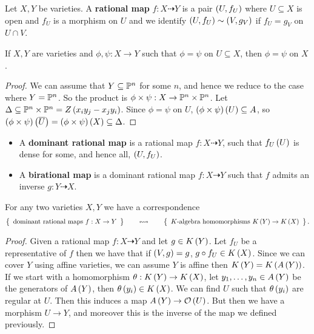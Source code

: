 
\begin{definition}
Let $ X, Y $ be varieties. A \textbf{rational map} $ f : X \dashrightarrow Y $ is a pair $ \rb{U, f_U} $ where $ U \subseteq X $ is open and $ f_U $ is a morphism on $ U $ and we identify $ \rb{U, f_U} \sim \rb{V, g_V} $ if $ f_U = g_V $ on $ U \cap V $.
\end{definition}

\begin{lemma}
If $ X, Y $ are varieties and $ \phi, \psi : X \to Y $ such that $ \phi = \psi $ on $ U \subseteq X $, then $ \phi = \psi $ on $ X $.
\end{lemma}

\begin{proof}
We can assume that $ Y \subseteq \P^n $ for some $ n $, and hence we reduce to the case where $ Y = \P^n $. So the product is $ \phi \times \psi : X \to \P^n \times \P^n $. Let $ \Delta \subseteq \P^n \times \P^n = Z\rb{x_iy_j - x_jy_i} $. Since $ \phi = \psi $ on $ U $, $ \rb{\phi \times \psi}\rb{U} \subseteq A $, so $ \rb{\phi \times \psi}\rb{\overline{U}} = \rb{\phi \times \psi}\rb{X} \subseteq \Delta $.
\end{proof}

\begin{definition}
\hfill
\begin{itemize}
\item A \textbf{dominant rational map} is a rational map $ f : X \dashrightarrow Y $, such that $ f_U\rb{U} $ is dense for some, and hence all, $ \rb{U, f_U} $.
\item A \textbf{birational map} is a dominant rational map $ f : X \dashrightarrow Y $ such that $ f $ admits an inverse $ g : Y \dashrightarrow X $.
\end{itemize}
\end{definition}

\begin{theorem}
For any two varieties $ X, Y $ we have a correspondence
$$ \correspondence{\text{dominant rational maps} \ f : X \to Y}{K \text{-algebra homomorphisms} \ K\rb{Y} \to K\rb{X}}. $$
\end{theorem}

\begin{proof}
Given a rational map $ f : X \dashrightarrow Y $ and let $ g \in K\rb{Y} $. Let $ f_U $ be a representative of $ f $ then we have that if $ \rb{V, g} = g $, $ g \circ f_U \in K\rb{X} $. Since we can cover $ Y $ using affine varieties, we can assume $ Y $ is affine then $ K\rb{Y} = K\rb{A\rb{Y}} $. If we start with a homomorphism $ \theta : K\rb{Y} \to K\rb{X} $, let $ y_1, \dots, y_n \in A\rb{Y} $ be the generators of $ A\rb{Y} $, then $ \theta\rb{y_i} \in K\rb{X} $. We can find $ U $ such that $ \theta\rb{y_i} $ are regular at $ U $. Then this induces a map $ A\rb{Y} \to \OO\rb{U} $. But then we have a morphism $ U \to Y $, and moreover this is the inverse of the map we defined previously.
\end{proof}

